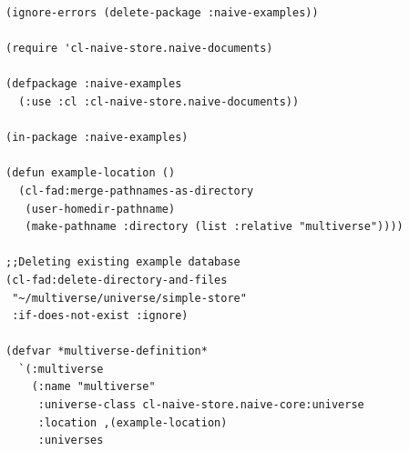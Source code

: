 \documentclass[11pt]{article}
\begin{document}
\begin{verbatim}
(ignore-errors (delete-package :naive-examples))

(require 'cl-naive-store.naive-documents)

(defpackage :naive-examples
  (:use :cl :cl-naive-store.naive-documents))

(in-package :naive-examples)

(defun example-location ()
  (cl-fad:merge-pathnames-as-directory
   (user-homedir-pathname)
   (make-pathname :directory (list :relative "multiverse"))))

;;Deleting existing example database
(cl-fad:delete-directory-and-files
 "~/multiverse/universe/simple-store"
 :if-does-not-exist :ignore)

(defvar *multiverse-definition*
  `(:multiverse
    (:name "multiverse"
     :universe-class cl-naive-store.naive-core:universe
     :location ,(example-location)
     :universes


\end{verbatim}
\end{document}
